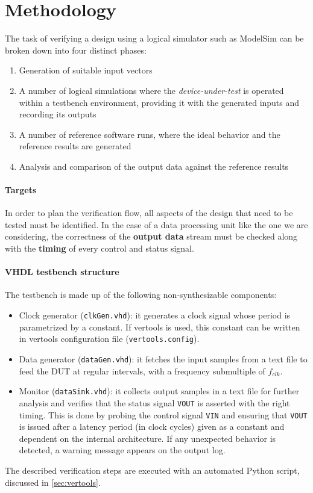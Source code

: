 \section{Methodology}
The task of verifying a design using a logical simulator such as ModelSim can be broken down into four distinct phases:
\begin{enumerate}
    \item Generation of suitable input vectors
    \item A number of logical simulations where the \textit{device-under-test} is operated within a testbench environment, providing it with the generated inputs and recording its outputs
    \item A number of reference software runs, where the ideal behavior and the reference results are generated
    \item Analysis and comparison of the output data against the reference results
\end{enumerate}

\paragraph{Targets} In order to plan the verification flow, all aspects of the design that need to be tested must be identified. In the case of a data processing unit like the one we are considering, the correctness of the \textbf{output data} stream must be checked along with the \textbf{timing} of every control and status signal.

\paragraph{VHDL testbench structure} The testbench is made up of the following non-synthesizable components:
\begin{itemize}
	\item Clock generator (\texttt{clkGen.vhd}): it generates a clock signal whose period is parametrized by a constant. If vertools is used, this constant can be written in vertools configuration file (\texttt{vertools.config}).
	\item Data generator (\texttt{dataGen.vhd}): it fetches the input samples from a text file to feed the DUT at regular intervals, with a frequency submultiple of $f_{clk}$.
	\item Monitor (\texttt{dataSink.vhd}): it collects output samples in a text file for further analysis and verifies that the status signal \texttt{VOUT} is asserted with the right timing. This is done by probing the control signal \texttt{VIN} and ensuring that \texttt{VOUT} is issued after a latency period (in clock cycles) given as a constant and dependent on the internal architecture. If any unexpected behavior is detected, a warning message appears on the output log.
\end{itemize}

The described verification steps are executed with an automated Python script, discussed in \autoref{sec:vertools}.
